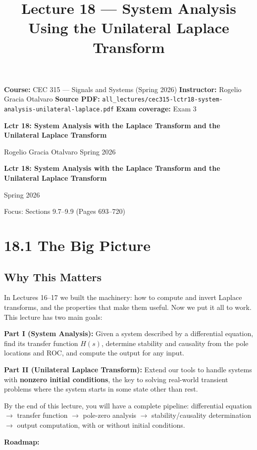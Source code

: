 \documentclass[11pt]{article}
\title{Lecture 18 — System Analysis Using the Unilateral Laplace Transform}
\author{}
\date{}
\begin{document}
\maketitle

\textbf{Course:} CEC 315 — Signals and Systems (Spring 2026)
\textbf{Instructor:} Rogelio Gracia Otalvaro
\textbf{Source PDF:} \texttt{all\_lectures/cec315-lctr18-system-analysis-unilateral-laplace.pdf}
\textbf{Exam coverage:} Exam 3

\textbf{Lctr 18: System Analysis with the Laplace Transform and the Unilateral Laplace Transform}

Rogelio Gracia Otalvaro
Spring 2026

\textbf{Lctr 18: System Analysis with the Laplace Transform and the Unilateral Laplace Transform}

Spring 2026

Focus: Sections 9.7–9.9 (Pages 693–720)

\section*{18.1 The Big Picture}

\subsection*{Why This Matters}

In Lectures 16–17 we built the machinery: how to compute and invert Laplace transforms, and the properties that make them useful. Now we put it all to work. This lecture has two main goals:

\textbf{Part I (System Analysis):} Given a system described by a differential equation, find its transfer function $H(s)$, determine stability and causality from the pole locations and ROC, and compute the output for any input.

\textbf{Part II (Unilateral Laplace Transform):} Extend our tools to handle systems with \textbf{nonzero initial conditions}, the key to solving real-world transient problems where the system starts in some state other than rest.

By the end of this lecture, you will have a complete pipeline: differential equation $\to$ transfer function $\to$ pole-zero analysis $\to$ stability/causality determination $\to$ output computation, with or without initial conditions.

\textbf{Roadmap:}
\end{document}
